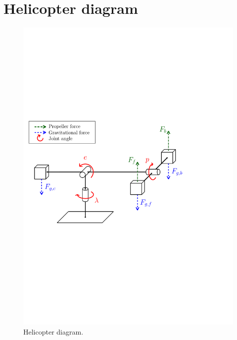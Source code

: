 \appendix

\section{Helicopter diagram}
\begin{figure}[htb]
	\centering
		\includegraphics[width = \textwidth]{figures/forces.pdf}
	\caption{Helicopter diagram.}
\label{fig:helicopter_dia}
\end{figure}


